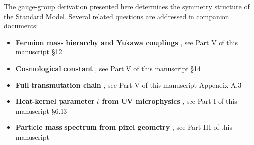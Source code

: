 The gauge-group derivation presented here determines the symmetry structure of the Standard Model. Several related questions are addressed in companion documents:

\begin{itemize}
\tightlist
\item
  \textbf{Fermion mass hierarchy and Yukawa couplings} , see Part V of this manuscript §12
\item
  \textbf{Cosmological constant} , see Part V of this manuscript §14
\item
  \textbf{Full transmutation chain} , see Part V of this manuscript Appendix A.3
\item
  \textbf{Heat-kernel parameter \(t\) from UV microphysics} , see Part I of this manuscript §6.13
\item
  \textbf{Particle mass spectrum from pixel geometry} , see Part III of this manuscript
\end{itemize}
